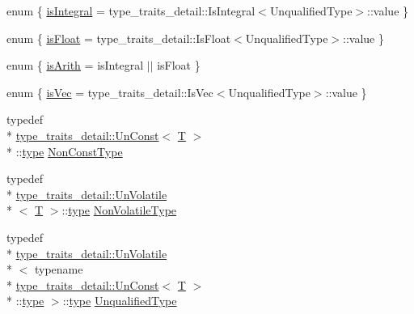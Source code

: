 \begin{DoxyCompactItemize}
enum \{ \hyperlink{structcv_1_1gpu_1_1device_1_1TypeTraits_aaee5e3a06b6165d42c95103ac9353418aafbf343d282dd7af2644e54ce9d82156}{is\-Integral} = type\-\_\-traits\-\_\-detail\-:\-:Is\-Integral$<$Unqualified\-Type$>$\-:\-:value
 \}
\item 
enum \{ \hyperlink{structcv_1_1gpu_1_1device_1_1TypeTraits_a1105027a8044e6dc92cc0b3669e46186aecc6d1c89bbabbeab0b5923b69524be6}{is\-Float} = type\-\_\-traits\-\_\-detail\-:\-:Is\-Float$<$Unqualified\-Type$>$\-:\-:value
 \}
\item 
enum \{ \hyperlink{structcv_1_1gpu_1_1device_1_1TypeTraits_a5217d1545337d09eef549e94ab3a0a28a2e61d3b1fa20d883ae07dc90e8903d69}{is\-Arith} = is\-Integral $\vert$$\vert$ is\-Float
 \}
\item 
enum \{ \hyperlink{structcv_1_1gpu_1_1device_1_1TypeTraits_af7de7964f05c34971145d4ec78fca202affdb3d6220ab72fc6cb1b6582618e608}{is\-Vec} = type\-\_\-traits\-\_\-detail\-:\-:Is\-Vec$<$Unqualified\-Type$>$\-:\-:value
 \}
\item 
typedef \\*
\hyperlink{structcv_1_1gpu_1_1device_1_1type__traits__detail_1_1UnConst}{type\-\_\-traits\-\_\-detail\-::\-Un\-Const}$<$ \hyperlink{calib3d_8hpp_a3efb9551a871ddd0463079a808916717}{T} $>$\\*
\-::\hyperlink{imgproc__c_8h_a84612d8738bf935200cf32a103d8efe1}{type} \hyperlink{structcv_1_1gpu_1_1device_1_1TypeTraits_a5eb017695f64e787767dd56e3c0c8ced}{Non\-Const\-Type}
\item 
typedef \\*
\hyperlink{structcv_1_1gpu_1_1device_1_1type__traits__detail_1_1UnVolatile}{type\-\_\-traits\-\_\-detail\-::\-Un\-Volatile}\\*
$<$ \hyperlink{calib3d_8hpp_a3efb9551a871ddd0463079a808916717}{T} $>$\-::\hyperlink{imgproc__c_8h_a84612d8738bf935200cf32a103d8efe1}{type} \hyperlink{structcv_1_1gpu_1_1device_1_1TypeTraits_a1accc54314dac906cf94ca2664e2052c}{Non\-Volatile\-Type}
\item 
typedef \\*
\hyperlink{structcv_1_1gpu_1_1device_1_1type__traits__detail_1_1UnVolatile}{type\-\_\-traits\-\_\-detail\-::\-Un\-Volatile}\\*
$<$ typename \\*
\hyperlink{structcv_1_1gpu_1_1device_1_1type__traits__detail_1_1UnConst}{type\-\_\-traits\-\_\-detail\-::\-Un\-Const}$<$ \hyperlink{calib3d_8hpp_a3efb9551a871ddd0463079a808916717}{T} $>$\\*
\-::\hyperlink{imgproc__c_8h_a84612d8738bf935200cf32a103d8efe1}{type} $>$\-::\hyperlink{imgproc__c_8h_a84612d8738bf935200cf32a103d8efe1}{type} \hyperlink{structcv_1_1gpu_1_1device_1_1TypeTraits_aa4919b39d8e375e205450f59857419a3}{Unqualified\-Type}
$$
\end{DoxyCompactItemize}
